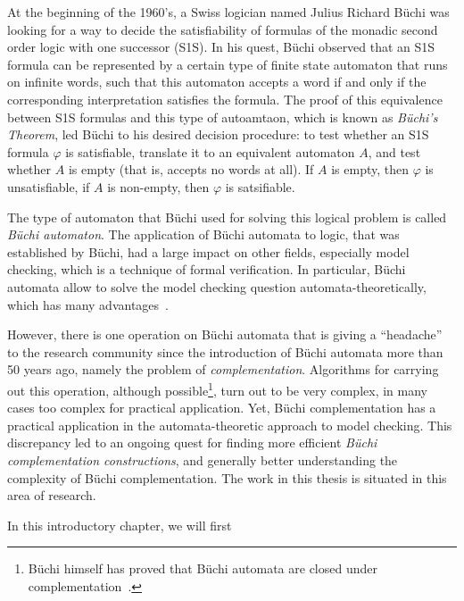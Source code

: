 At the beginning of the 1960's, a Swiss logician named Julius Richard Büchi was looking for a way to decide the satisfiability of formulas of the monadic second order logic with one successor (S1S). In his quest, Büchi observed that an S1S formula can be represented by a certain type of finite state automaton that runs on infinite words, such that this automaton accepts a word if and only if the corresponding interpretation satisfies the formula. The proof of this equivalence between S1S formulas and this type of autoamtaon, which is known as \textit{Büchi's Theorem}, led Büchi to his desired decision procedure: to test whether an S1S formula $\varphi$ is satisfiable, translate it to an equivalent automaton $A$, and test whether $A$ is empty (that is, accepts no words at all). If $A$ is empty, then $\varphi$ is unsatisfiable, if $A$ is non-empty, then $\varphi$ is satsifiable.~\cite{buchi1960decision}

The type of automaton that Büchi used for solving this logical problem is called \textit{Büchi automaton}. The application of Büchi automata to logic, that was established by Büchi, had a large impact on other fields, especially model checking, which is a technique of formal verification. In particular, Büchi automata allow to solve the model checking question automata-theoretically, which has many advantages~\cite{1996_vardi}.

However, there is one operation on Büchi automata that is giving a ``headache'' to the research community since the introduction of Büchi automata more than 50 years ago, namely the problem of \textit{complementation}. Algorithms for carrying out this operation, although possible\footnote{Büchi himself has proved that Büchi automata are closed under complementation~\cite{buchi1960decision}.}, turn out to be very complex, in many cases too complex for practical application. Yet, Büchi complementation has a practical application in the automata-theoretic approach to model checking. This discrepancy led to an ongoing quest for finding more efficient \textit{Büchi complementation constructions}, and generally better understanding the complexity of Büchi complementation. The work in this thesis is situated in this area of research.

In this introductory chapter, we will first 




